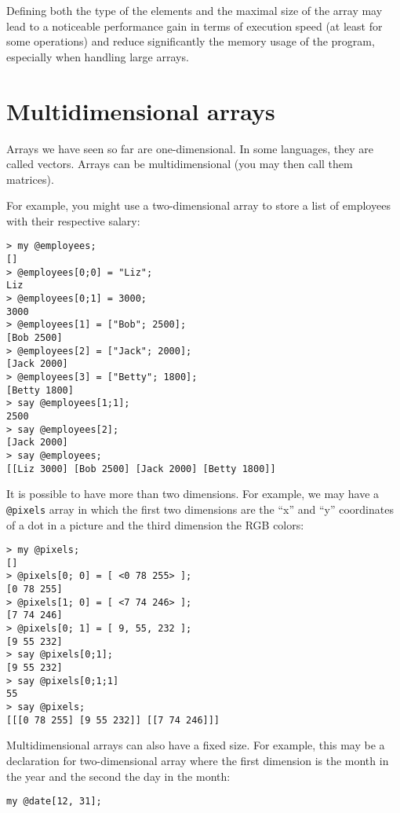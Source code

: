 Defining both the type of the elements and the maximal size 
of the array may lead to a noticeable performance gain 
in terms of execution speed (at least for some operations) 
and reduce significantly the memory usage of the program, 
especially when handling large arrays.

\section{Multidimensional arrays}
\label{multidimensional array}
\label{multidimensional_array}

Arrays we have seen so far are one-dimensional. In some 
languages, they are called vectors. Arrays can be 
multidimensional (you may then call them matrices).

For example, you might use a two-dimensional array to 
store a list of employees with their respective salary:

\begin{verbatim}
> my @employees;
[]
> @employees[0;0] = "Liz";
Liz
> @employees[0;1] = 3000;
3000
> @employees[1] = ["Bob"; 2500];
[Bob 2500]
> @employees[2] = ["Jack"; 2000];
[Jack 2000]
> @employees[3] = ["Betty"; 1800];
[Betty 1800]
> say @employees[1;1];
2500
> say @employees[2];
[Jack 2000]
> say @employees;
[[Liz 3000] [Bob 2500] [Jack 2000] [Betty 1800]]
\end{verbatim}

It is possible to have more than two dimensions. For example, 
we may have a \verb'@pixels' array in which the first two 
dimensions are the ``x'' and ``y'' coordinates of a dot in
a picture and the third dimension the RGB colors:

\begin{verbatim}
> my @pixels;
[]
> @pixels[0; 0] = [ <0 78 255> ];
[0 78 255]
> @pixels[1; 0] = [ <7 74 246> ];
[7 74 246]
> @pixels[0; 1] = [ 9, 55, 232 ];
[9 55 232]
> say @pixels[0;1];
[9 55 232]
> say @pixels[0;1;1]
55
> say @pixels;
[[[0 78 255] [9 55 232]] [[7 74 246]]]
\end{verbatim} 

Multidimensional arrays can also have a fixed size. For 
example, this may be a declaration for two-dimensional array 
where the first dimension is the month in the year and 
the second the day in the month:

\begin{verbatim}
my @date[12, 31];
\end{verbatim}


